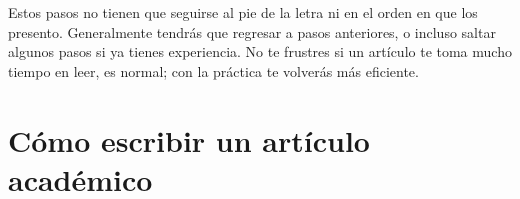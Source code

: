 Estos pasos no tienen que seguirse al pie de la letra ni en el orden en que los
presento.
Generalmente tendrás que regresar a pasos anteriores, o incluso saltar algunos
pasos si ya tienes experiencia.
No te frustres si un artículo te toma mucho tiempo en leer, es normal; con la
práctica te volverás más eficiente.

\section{Cómo escribir un artículo académico}
\label{sec:comoescribir}
